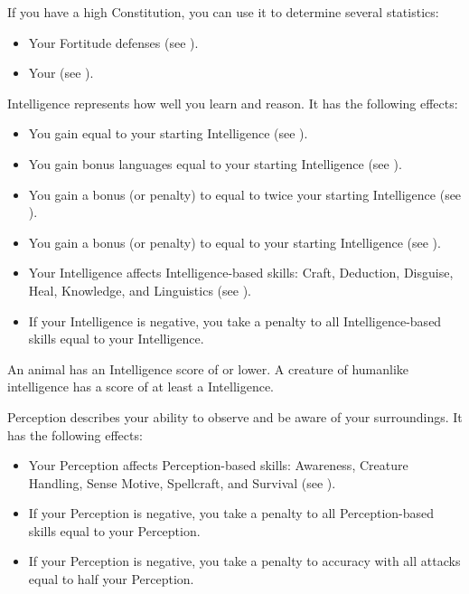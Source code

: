                 If you have a high Constitution, you can use it to determine several statistics:
                \begin{itemize}
                    \item Your Fortitude defenses (see ).
                    \item Your  (see ).
                \end{itemize}

            \label{Intelligence}
                Intelligence represents how well you learn and reason.
                It has the following effects:

                \begin{itemize}
                    \item You gain  equal to your starting Intelligence (see ).
                    \item You gain bonus languages equal to your starting Intelligence (see ).
                    \item You gain a bonus (or penalty) to  equal to twice your starting Intelligence (see ).
                    \item You gain a bonus (or penalty) to  equal to your starting Intelligence (see ).
                    \item Your Intelligence affects Intelligence-based skills: Craft, Deduction, Disguise, Heal, Knowledge, and Linguistics (see ).
                    \item If your Intelligence is negative, you take a penalty to all Intelligence-based skills equal to your Intelligence.
                \end{itemize}

                \par An animal has an Intelligence score of  or lower.
                A creature of humanlike intelligence has a score of at least a  Intelligence.

            \label{Perception}
                Perception describes your ability to observe and be aware of your surroundings.
                It has the following effects:
                \begin{itemize}
                    \item Your Perception affects Perception-based skills: Awareness, Creature Handling, Sense Motive, Spellcraft, and Survival (see ).
                    \item If your Perception is negative, you take a penalty to all Perception-based skills equal to your Perception.
                    \item If your Perception is negative, you take a penalty to accuracy with all attacks equal to half your Perception.
                \end{itemize}

